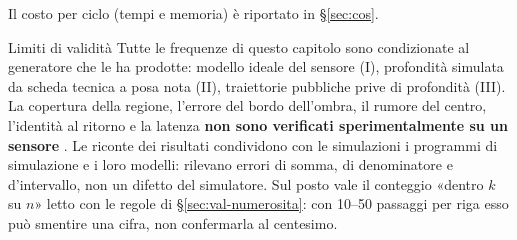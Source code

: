 Il costo per ciclo (tempi e memoria) è riportato in \S\ref{sec:cos}.
\begin{riquadro}{Limiti di validità}
Tutte le frequenze di questo capitolo sono condizionate al generatore che le ha prodotte: modello ideale del sensore (I), profondità simulata da scheda tecnica a posa nota (II), traiettorie pubbliche prive di profondità (III). La copertura della regione, l'errore del bordo dell'ombra, il rumore del centro, l'identità al ritorno e la latenza \textbf{non sono verificati sperimentalmente su un sensore} . Le riconte dei risultati condividono con le simulazioni i programmi di simulazione e i loro modelli: rilevano errori di somma, di denominatore e d'intervallo, non un difetto del simulatore. Sul posto vale il conteggio «dentro $k$ su $n$» letto con le regole di \S\ref{sec:val-numerosita}: con 10–50 passaggi per riga esso può smentire una cifra, non confermarla al centesimo.
\end{riquadro}
